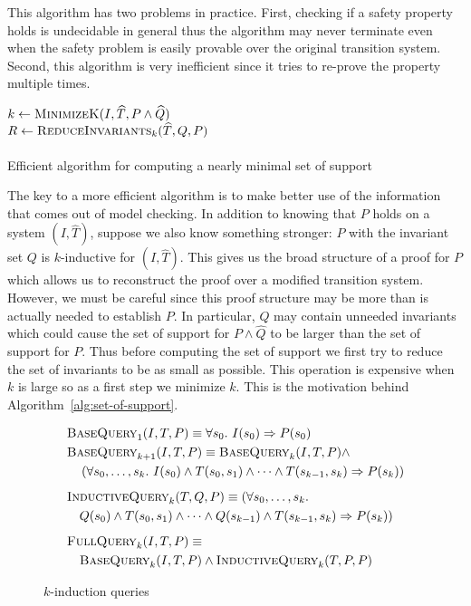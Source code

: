 This algorithm has two problems in practice. First, checking if a
safety property holds is undecidable in general thus the algorithm may
never terminate even when the safety problem is easily provable over
the original transition system. Second, this algorithm is very
inefficient since it tries to re-prove the property multiple times.

\begin{algorithm}[t]
  \BlankLine
  $k \leftarrow \textsc{MinimizeK}(I, \widehat T, P \land \widehat Q)$ \\
  $R \leftarrow \textsc{ReduceInvariants}_k(\widehat T, Q, P)$ \\
  \\
\caption{Efficient algorithm for computing a nearly minimal set of support}
\label{alg:set-of-support}
\end{algorithm}

The key to a more efficient algorithm is to make better use of the
information that comes out of model checking. In addition to knowing
that $P$ holds on a system $(I, \widehat T)$, suppose we also know
something stronger: $P$ with the invariant set $Q$ is $k$-inductive
for $(I, \widehat T)$. This gives us the broad structure of a proof
for $P$ which allows us to reconstruct the proof over a modified
transition system. However, we must be careful since this proof
structure may be more than is actually needed to establish $P$. In
particular, $Q$ may contain unneeded invariants which could cause the
set of support for $P \land \widehat Q$ to be larger than the set of
support for $P$. Thus before computing the set of support we first try
to reduce the set of invariants to be as small as possible. This
operation is expensive when $k$ is large so as a first step we
minimize $k$. This is the motivation behind
Algorithm~\ref{alg:set-of-support}.

\begin{figure}
\begin{align*}
  &\bq_1(I, T, P) \equiv \forall s_0.~ I(s_0) \Rightarrow P(s_0) \\
  &\bq_{k+1}(I, T, P) \equiv \bq_k(I, T, P) \land~ \\
%
  &\hspace{10pt}\left(\forall s_0, \ldots, s_k.~ I(s_0) \land T(s_0,
  s_1) \land \cdots \land T(s_{k-1}, s_k) \Rightarrow P(s_k)\right)
  \\[5pt]
  &\iq_k(T, Q, P) \equiv (\forall s_0, \ldots, s_k.~\\
%
  &\hspace{10pt} Q(s_0) \land T(s_0,
  s_1) \land \cdots \land Q(s_{k-1}) \land T(s_{k-1}, s_k) \Rightarrow
  P(s_k)) \\[5pt]
  &\fq_k(I, T, P) \equiv \\
%
  &\hspace{10pt}\bq_k(I, T, P) \land \iq_k(T, P, P)
\end{align*}
\caption{$k$-induction queries}
\label{fig:queries}
\end{figure}

